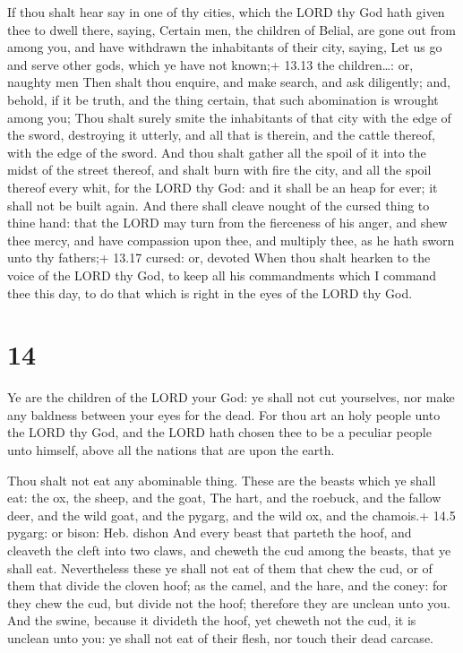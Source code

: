  If thou shalt hear say in one of thy cities, which the
LORD thy God hath given thee to dwell there, saying, 
Certain men, the children of Belial, are gone out from among you, and
have withdrawn the inhabitants of their city, saying, Let us go and
serve other gods, which ye have not known;+ 13.13 the children\ldots:
or, naughty men  Then shalt thou enquire, and make search,
and ask diligently; and, behold, if it be truth, and the thing certain,
that such abomination is wrought among you;  Thou shalt
surely smite the inhabitants of that city with the edge of the sword,
destroying it utterly, and all that is therein, and the cattle thereof,
with the edge of the sword.  And thou shalt gather all the
spoil of it into the midst of the street thereof, and shalt burn with
fire the city, and all the spoil thereof every whit, for the LORD thy
God: and it shall be an heap for ever; it shall not be built again.
 And there shall cleave nought of the cursed thing to thine
hand: that the LORD may turn from the fierceness of his anger, and shew
thee mercy, and have compassion upon thee, and multiply thee, as he hath
sworn unto thy fathers;+ 13.17 cursed: or, devoted  When
thou shalt hearken to the voice of the LORD thy God, to keep all his
commandments which I command thee this day, to do that which is right in
the eyes of the LORD thy God.

\hypertarget{section-13}{%
\section{14}\label{section-13}}

 Ye are the children of the LORD your God: ye shall not cut
yourselves, nor make any baldness between your eyes for the dead.
 For thou art an holy people unto the LORD thy God, and the
LORD hath chosen thee to be a peculiar people unto himself, above all
the nations that are upon the earth.

 Thou shalt not eat any abominable thing. 
These are the beasts which ye shall eat: the ox, the sheep, and the
goat,  The hart, and the roebuck, and the fallow deer, and
the wild goat, and the pygarg, and the wild ox, and the chamois.+ 14.5
pygarg: or bison: Heb. dishon  And every beast that parteth
the hoof, and cleaveth the cleft into two claws, and cheweth the cud
among the beasts, that ye shall eat.  Nevertheless these ye
shall not eat of them that chew the cud, or of them that divide the
cloven hoof; as the camel, and the hare, and the coney: for they chew
the cud, but divide not the hoof; therefore they are unclean unto you.
 And the swine, because it divideth the hoof, yet cheweth
not the cud, it is unclean unto you: ye shall not eat of their flesh,
nor touch their dead carcase.

